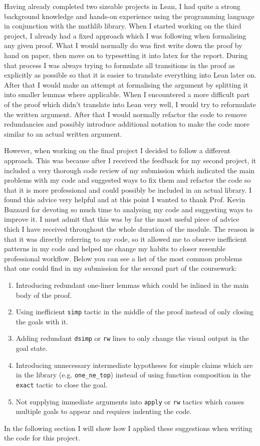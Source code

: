 \documentclass[11pt]{article}
\begin{document}
Having already completed two sizeable projects in Lean, I had quite a strong
background knowledge and hands-on experience using the programming language in
conjunction with the mathlib library. When I started working on the third
project, I already had a fixed approach which I was following when formalising
any given proof. What I would normally do was first write down the proof by
hand on paper, then move on to typesetting it into latex for the report. During
that process I was always trying to formulate all transitions in the proof as
explicitly as possible so that it is easier to translate everything into Lean
later on. After that I would make an attempt at formalising the argument by
splitting it into smaller lemmas where applicable. When I encountered a more
difficult part of the proof which didn't translate into Lean very well, I would
try to reformulate the written argument. After that I would normally refactor
the code to remove redundancies and possibly introduce additional notation to
make the code more similar to an actual written argument.

However, when working on the final project I decided to follow a different approach.
This was because after I received the feedback for my second project, it included
a very thorough code review of my submission which indicated the main problems
with my code and suggested ways to fix them and refactor the code so that it is
more professional and could possibly be included in an actual library. I found
this advice very helpful and at this point I wanted to thank Prof. Kevin Buzzard
for devoting so much time to analysing my code and suggesting ways to improve it.
I must admit that this was by far the most useful piece of advice thich I have
received throughout the whole duration of the module. The reason is that it
was directly referring to my code, so it allowed me to observe inefficient patterns
in my code and helped me change my habits to closer resemble professional workflow.
Below you can see a list of the most common problems that one could find in my
submission for the second part of the coursework:
\begin{enumerate}
  \item Introducing redundant one-liner lemmas which could be inlined in the main
    body of the proof.
  \item Using inefficient \texttt{simp} tactic in the middle of the proof instead of only closing the goals with it.
  \item Adding redundant \texttt{dsimp} or \texttt{rw} lines to only change the visual output in the goal state.
  \item Introducing unnecessary intermediate hypotheses for simple claims which
    are in the library (e.g. \texttt{one\_ne\_top}) instead of using function composition
    in the \texttt{exact} tactic to close the goal.
  \item Not supplying immediate arguments into \texttt{apply} or \texttt{rw} tactics
    which causes multiple goals to appear and requires indenting the code.
\end{enumerate}
In the following section I will show how I applied these suggestions when writing
the code for this project.
\end{document}
